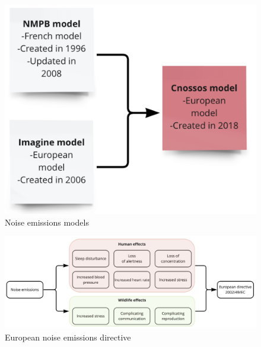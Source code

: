 \documentclass{article}
\begin{document}
\begin{figure}[H]
    \begin{center}
        \includegraphics[width=14cm]{Noise emissions models.png}
        \caption{Noise emissions models}
        \label{Noise emissions models}
    \end{center}
\end{figure}

\begin{figure}[H]
    \begin{center}
        \includegraphics[width=14cm]{European noise emissions directive.png}
        \caption{European noise emissions directive}
        \label{European noise emissions directive}
    \end{center}
\end{figure}






\newpage


\end{document}
